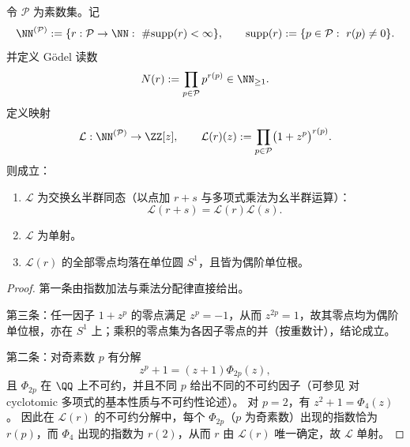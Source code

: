 \begin{theorem}\label{thm:xi-leyang-godel-prime-register-algebraic-identifiability}
令 \(\mathcal P\) 为素数集。记
\[
\NN^{(\mathcal P)}:=\{r:\mathcal P\to\NN:\ \#\mathrm{supp}(r)<\infty\},
\qquad
\mathrm{supp}(r):=\{p\in\mathcal P:\ r(p)\neq 0\}.
\]
并定义 Gödel 读数
\[
N(r):=\prod_{p\in\mathcal P}p^{r(p)}\in\NN_{\ge 1}.
\]
定义映射
\[
\mathcal L:\NN^{(\mathcal P)}\to \ZZ[z],
\qquad
\mathcal L(r)(z):=\prod_{p\in\mathcal P}\bigl(1+z^p\bigr)^{r(p)}.
\]
则成立：
\begin{enumerate}
  \item \(\mathcal L\) 为交换幺半群同态（以点加 \(r+s\) 与多项式乘法为幺半群运算）：
  \[
  \mathcal L(r+s)=\mathcal L(r)\mathcal L(s).
  \]
  \item \(\mathcal L\) 为单射。
  \item \(\mathcal L(r)\) 的全部零点均落在单位圆 \(S^1\)，且皆为偶阶单位根。
\end{enumerate}
\end{theorem}
\begin{proof}
第一条由指数加法与乘法分配律直接给出。
\par
第三条：任一因子 \(1+z^p\) 的零点满足 \(z^p=-1\)，从而 \(z^{2p}=1\)，故其零点均为偶阶单位根，亦在 \(S^1\) 上；乘积的零点集为各因子零点的并（按重数计），结论成立。
\par
第二条：对奇素数 \(p\) 有分解
\[
z^p+1=(z+1)\Phi_{2p}(z),
\]
且 \(\Phi_{2p}\) 在 \(\QQ\) 上不可约，并且不同 \(p\) 给出不同的不可约因子（可参见 \cite{Serre1973CourseArithmetic} 对 cyclotomic 多项式的基本性质与不可约性论述）。
对 \(p=2\)，有 \(z^2+1=\Phi_4(z)\)。
因此在 \(\mathcal L(r)\) 的不可约分解中，每个 \(\Phi_{2p}\)（\(p\) 为奇素数）出现的指数恰为 \(r(p)\)，而 \(\Phi_4\) 出现的指数为 \(r(2)\)，从而 \(r\) 由 \(\mathcal L(r)\) 唯一确定，故 \(\mathcal L\) 单射。
\end{proof}

